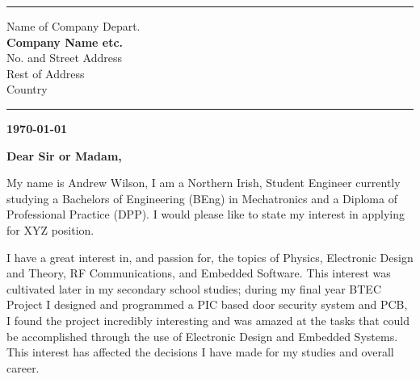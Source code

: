 \documentclass[12pt,a4paper,ragged2e,withhyper]{altacv}
\begin{document}

  
\begin{adjustwidth}{7cm}{}
\makecvheader

{\color{headingrule}\rule{\linewidth}{2pt}\par}
\end{adjustwidth}

\medskip
\begin{paracol}{2}
{\taglinefont\color{tagline}Name of Company Depart.} \\
\textbf{\color{accent}Company Name etc.} \\
No. and Street Address \\
Rest of Address \\
Country \\

{\color{headingrule}\rule{6cm}{2pt}\par}

\switchcolumn

\begin{flushright}
	\textbf{\today}
\end{flushright}

\end{paracol}

\vspace{5mm}





\textbf{Dear Sir or Madam,} \\

\vspace{5mm}



My name is Andrew Wilson, I am a Northern Irish, Student Engineer currently studying a Bachelors of Engineering (BEng) in Mechatronics and a Diploma of Professional Practice (DPP).
I would please like to state my interest in applying for XYZ position.\linebreak

I have a great interest in, and passion for, the topics of Physics, Electronic Design and Theory, RF Communications, and Embedded Software. This interest was cultivated later in my secondary school studies; during my final year BTEC Project I designed and programmed a PIC based door security system and PCB, I found the project incredibly interesting and was amazed at the tasks that could be accomplished through the use of Electronic Design and Embedded Systems. This interest has affected the decisions I have made for my studies and overall career. \linebreak
\end{document}
